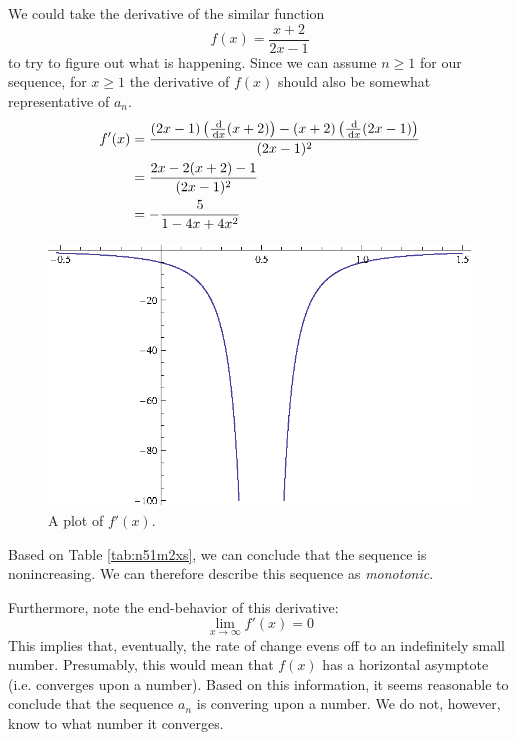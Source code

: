\begin{ex}
    We could take the derivative of the similar function
    \[ f(x)=\frac{x+2}{2x-1} \]
    to try to figure out what is happening. Since we can assume \(n \geq 1\) for
    our sequence, for \(x \geq 1\) the derivative of \(f(x)\) should also be
    somewhat representative of \(a_n\).
    \begin{align*}
      f'(x)&= \frac{(2 x-1) \left(\frac{\,\mathrm{d}}{\,\mathrm{d} x}(x+2)\right)-(x+2)
      \left(\frac{\,\mathrm{d}}{\,\mathrm{d} x}(2 x-1)\right)}{(2 x-1)^2}
      \\
      &=\frac{2 x-2 (x+2)-1}{(2 x-1)^2} \\
      &=-\frac{5}{1-4 x+4 x^2}
    \end{align*}
    \begin{table}[h]
      \centering
      \caption{A sign diagram for \(f'(x)\).}
      \label{tab:n51m2xs}
    \end{table}
    \begin{figure}[h]
      \begin{center}
        \includegraphics{graphs/n51m2xs.eps}
      \end{center}
      \caption{A plot of \(f'(x)\).}
      \label{fig:n51m2xs}
    \end{figure}
    Based on Table \ref{tab:n51m2xs}, we can conclude that the sequence is
    nonincreasing. We can therefore describe this sequence as \emph{monotonic}.

    Furthermore, note the end-behavior of this derivative:
    \[ \lim_{x \to \infty} f'(x) = 0 \]
    This implies that, eventually, the rate of change evens off to an indefinitely small number.
    Presumably, this would mean that \(f(x)\) has a horizontal asymptote (i.e. converges upon a number).
    Based on this information, it seems reasonable to conclude that the sequence \(a_n\) is convering upon a number.
    We do not, however, know to what number it converges.


\end{ex}
